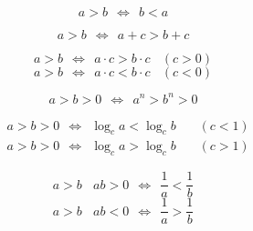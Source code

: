 \documentclass[UTF8]{ctexart}
\begin{document}
    \begin{large}
        \begin{equation*}
            a>b~~\Leftrightarrow~~b<a
        \end{equation*}
    \end{large}

    \begin{large}
        \begin{equation*}
            a>b~~\Leftrightarrow~~a+c>b+c
        \end{equation*}
    \end{large}

    \begin{large}
        \begin{equation*}
            a>b~~\Leftrightarrow~~a\cdot c>b\cdot c~~~~(c>0)
        \end{equation*}
        \begin{equation*}
            a>b~~\Leftrightarrow~~a\cdot c<b\cdot c~~~~(c<0)
        \end{equation*}
    \end{large}

    \begin{large}
        \begin{equation*}
            a>b>0~~\Leftrightarrow~~a^n>b^n>0
        \end{equation*}
    \end{large}

    \begin{large}
        \begin{align*}
            &a>b>0~~\Leftrightarrow~~\log_{c}a<\log_{c}b~~~~~~~~(c<1)\\[1mm]
            &a>b>0~~\Leftrightarrow~~\log_{c}a>\log_{c}b~~~~~~~~(c>1)
        \end{align*}
    \end{large}

    \begin{large}
        \begin{equation*}
            a>b~~~~ab>0~~\Leftrightarrow~~\frac{1}{a}<\frac{1}{b}
        \end{equation*}
        \vspace{5pt}
        \begin{equation*}
            a>b~~~~ab<0~~\Leftrightarrow~~\frac{1}{a}>\frac{1}{b}
        \end{equation*}
    \end{large}
\end{document}
